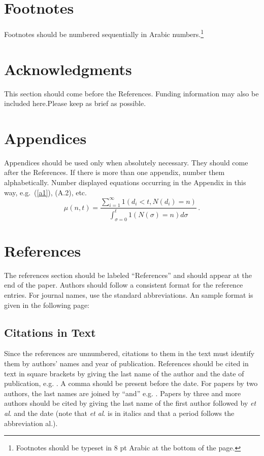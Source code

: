 \documentclass{ws-ijicc}
\begin{document}
\section{Footnotes}
Footnotes should be numbered sequentially in Arabic
numbers.\footnote{Footnotes should be typeset in 8 pt Arabic at the
bottom of the page.}

\section*{Acknowledgments}
This section should come before the References. Funding information
may also be included here.Please keep as brief as possible.

\appendix

\section{Appendices}

Appendices should be used only when absolutely necessary. They should
come after the References. If there is more than one appendix, number
them alphabetically. Number displayed equations occurring in the
Appendix in this way, e.g.~(\ref{a1}), (A.2), etc.
\begin{equation}
\mu(n, t) = \frac{\sum^\infty_{i=1} 1(d_i < t,
N(d_i) = n)}{\int^t_{\sigma=0} 1(N(\sigma) = n)d\sigma}\,.
\label{a1}
\end{equation}

\section*{References}
The references section should be labeled ``References'' and should appear
at the end of the paper. Authors should follow a consistent format
for the reference entries. For journal names, use the standard abbreviations.
An sample format is given in the following page:

\subsection*{Citations in Text}
Since the references are unnumbered, citations to them in the text
must identify them by authors' names and year of
publication. References should be cited in text in square brackets by
giving the last name of the author and the date of publication,
e.g. \cite{wong89}. A comma should be present before the date.  For
papers by two authors, the last names are joined by ``and''
e.g. \cite{hussaini}. Papers by three and more authors should be cited
by  giving the last name of the first author followed by {\it et al}.
and the date (note that {\it et al}. is in italics and that a period
follows the abbreviation al.).
\end{document}
